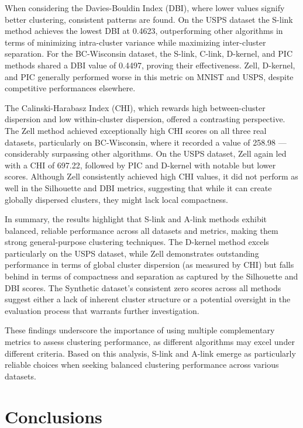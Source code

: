 \documentclass[
	10pt,
	parskip=half-,	
	paper=a4,
	english
	]{scrartcl}
\begin{document}
When considering the Davies-Bouldin Index (DBI), where lower values signify better clustering, consistent patterns are found. On the USPS dataset the S-link method achieves the lowest DBI at 0.4623, outperforming other algorithms in terms of minimizing intra-cluster variance while maximizing inter-cluster separation. For the BC-Wisconsin dataset, the S-link, C-link, D-kernel, and PIC methods shared a DBI value of 0.4497, proving their effectiveness. Zell, D-kernel, and PIC generally performed worse in this metric on MNIST and USPS, despite competitive performances elsewhere.

The Calinski-Harabasz Index (CHI), which rewards high between-cluster dispersion and low within-cluster dispersion, offered a contrasting perspective. The Zell method achieved exceptionally high CHI scores on all three real datasets, particularly on BC-Wisconsin, where it recorded a value of 258.98 — considerably surpassing other algorithms. On the USPS dataset, Zell again led with a CHI of 697.22, followed by PIC and D-kernel with notable but lower scores. Although Zell consistently achieved high CHI values, it did not perform as well in the Silhouette and DBI metrics, suggesting that while it can create globally dispersed clusters, they might lack local compactness.

In summary, the results highlight that S-link and A-link methods exhibit balanced, reliable performance across all datasets and metrics, making them strong general-purpose clustering techniques. The D-kernel method excels particularly on the USPS dataset, while Zell demonstrates outstanding performance in terms of global cluster dispersion (as measured by CHI) but falls behind in terms of compactness and separation as captured by the Silhouette and DBI scores. The Synthetic dataset’s consistent zero scores across all methods suggest either a lack of inherent cluster structure or a potential oversight in the evaluation process that warrants further investigation.

These findings underscore the importance of using multiple complementary metrics to assess clustering performance, as different algorithms may excel under different criteria. Based on this analysis, S-link and A-link emerge as particularly reliable choices when seeking balanced clustering performance across various datasets.

\section{Conclusions}
\end{document}
